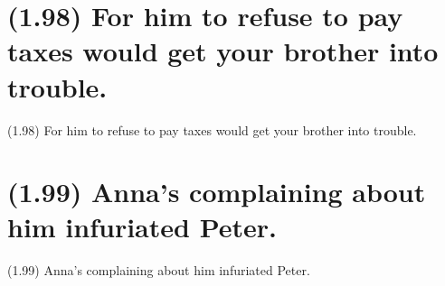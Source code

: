 \documentclass{article}
\begin{document}
\clearpage

%
%

\section*{(1.98) For him to refuse to pay taxes would get your brother into trouble.}

\bigbreak
\begin{enumerate*}
\item[(1.98)] For him to refuse to pay taxes would get your brother into trouble.
\end{enumerate*}
\bigbreak

\bigbreak
\begin{minipage}{\textwidth}
\end{minipage}
\bigbreak

\clearpage

%
%

\section*{(1.99) Anna's complaining about him infuriated Peter.}

\bigbreak
\begin{enumerate*}
\item[(1.99)] Anna's complaining about him infuriated Peter.
\end{enumerate*}
\bigbreak
\end{document}
